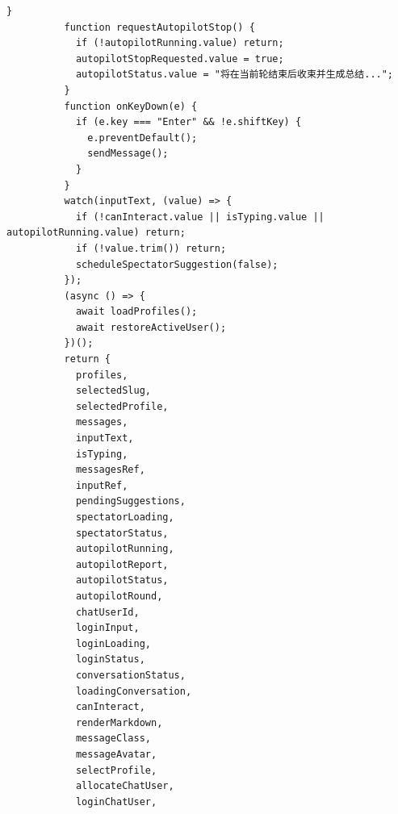 \documentclass[12pt,a4paper]{article}
\begin{document}
\newpage
{}
\fancyhead[R]{}
\begin{Verbatim}[fontsize=\footnotesize]
          }
          function requestAutopilotStop() {
            if (!autopilotRunning.value) return;
            autopilotStopRequested.value = true;
            autopilotStatus.value = "将在当前轮结束后收束并生成总结...";
          }
          function onKeyDown(e) {
            if (e.key === "Enter" && !e.shiftKey) {
              e.preventDefault();
              sendMessage();
            }
          }
          watch(inputText, (value) => {
            if (!canInteract.value || isTyping.value || autopilotRunning.value) return;
            if (!value.trim()) return;
            scheduleSpectatorSuggestion(false);
          });
          (async () => {
            await loadProfiles();
            await restoreActiveUser();
          })();
          return {
            profiles,
            selectedSlug,
            selectedProfile,
            messages,
            inputText,
            isTyping,
            messagesRef,
            inputRef,
            pendingSuggestions,
            spectatorLoading,
            spectatorStatus,
            autopilotRunning,
            autopilotReport,
            autopilotStatus,
            autopilotRound,
            chatUserId,
            loginInput,
            loginLoading,
            loginStatus,
            conversationStatus,
            loadingConversation,
            canInteract,
            renderMarkdown,
            messageClass,
            messageAvatar,
            selectProfile,
            allocateChatUser,
            loginChatUser,
\end{Verbatim}
\newpage
{}
\fancyhead[R]{}
\end{document}
